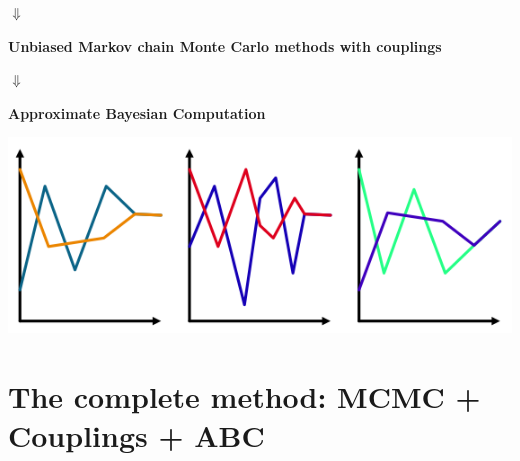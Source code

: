 \documentclass{beamer}
\begin{document}
\begin{frame}
			\vspace{0.5cm}
			
			\begin{minipage}{0.45\textwidth}
				\begin{center}
					$\Downarrow$
					
					\textbf{Unbiased Markov chain Monte Carlo methods with couplings}
				\end{center}
			\end{minipage} %
			\hfill
			\begin{minipage}{0.45\textwidth}
				\begin{center}
					$\Downarrow$
					
					\textbf{Approximate Bayesian Computation}
				\end{center}
			\end{minipage} %
			
			\vspace{0.2cm}
			
			\begin{minipage}{0.45\textwidth}
				\begin{center}
					\includegraphics{img/markov_coupled_parallel}
				\end{center}
			\end{minipage}%
			\hfill
			\begin{minipage}{0.45\textwidth}
				
			\end{minipage}
			
			
			
		\end{frame}
		
	
	


\section{The complete method: MCMC + Couplings + ABC}
	
	\begin{frame}[plain]{}
		\sectionpage
	\end{frame}
	
\end{document}
